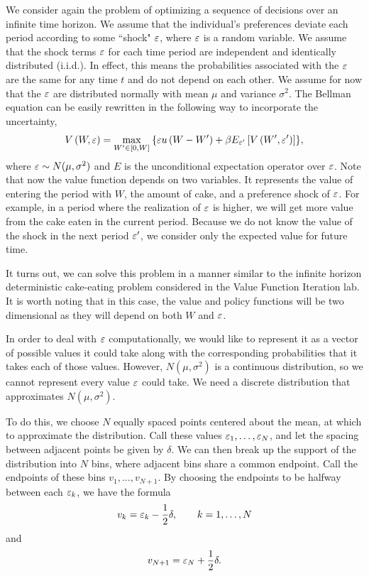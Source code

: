 We consider again the problem of optimizing a sequence of decisions over an infinite time horizon.
We assume that the individual's preferences deviate each period according to some ``shock" $\varepsilon$,
where $\varepsilon$ is a random variable.  We assume that the shock terms $\varepsilon$ for each time period are
independent and identically
distributed (i.i.d.).  In effect, this means the probabilities associated with the $\varepsilon$ are the
same for any time $t$ and do not depend on each other.  We assume for now that the $\varepsilon$ are
distributed normally with mean $\mu$ and variance $\sigma^2$.  The Bellman equation can be easily
rewritten in the following way to incorporate the uncertainty,
\begin{equation}\label{stoch_Bellman}
   V\left(W,\varepsilon\right) = \max_{W'\in[0,W]}\: \{\varepsilon u\left(W - W'\right) +
   \beta E_{\varepsilon'}\left[V\left(W',\varepsilon'\right)\right]\},
\end{equation}
where $\varepsilon \sim N(\mu,\sigma^2)$ and
$E$ is the unconditional expectation operator over $\varepsilon$.  Note that now the value function depends
on two variables.  It represents the value of entering the period with $W$, the amount of cake,
and a preference shock of $\varepsilon$.  For example, in a period where the realization of $\varepsilon$ is higher,
we will get more value from the cake eaten in the current period.  Because we do not know the value of
the shock in the next period $\varepsilon'$, we consider only the expected value for future time.

It turns out, we can solve this problem in a manner similar to the infinite horizon deterministic cake-eating
problem considered in the Value Function Iteration lab.  It is worth noting that in this case,
 the value and policy functions will be two dimensional as they will depend on both $W$ and $\varepsilon$.

In order to deal with $\varepsilon$ computationally, we would like to represent it as a vector of possible values
it could take along with the corresponding probabilities that it takes each of those values.  However,
$N(\mu,\sigma^2)$ is a continuous distribution, so we cannot represent every value $\varepsilon$ could take.
We need a discrete distribution that approximates $N(\mu,\sigma^2)$.

To do this, we choose $N$ equally spaced points centered about the mean, at which to approximate the
distribution. Call these values $\varepsilon_1,\ldots,\varepsilon_N$, and let the spacing between adjacent points be
given by $\delta$.
We can then break up the support of the distribution into $N$ bins, where adjacent bins share a common
endpoint. Call the endpoints of these bins $v_1,\ldots,v_{N+1}$. By choosing the endpoints to be
halfway between each $\varepsilon_k$, we have the formula
\[
v_k = \varepsilon_k - \frac{1}{2}\delta, \qquad k=1,\ldots,N
\]
and
\[
v_{N+1} = \varepsilon_N + \frac{1}{2}\delta.
\]

